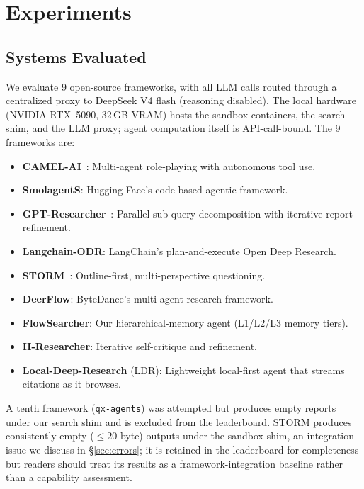 \documentclass{article}
\begin{document}
\section{Experiments}
\label{sec:experiments}

\subsection{Systems Evaluated}

We evaluate 9 open-source frameworks, with all LLM calls routed through a centralized proxy to DeepSeek V4 flash (reasoning disabled). The local hardware (NVIDIA RTX~5090, 32\,GB VRAM) hosts the sandbox containers, the search shim, and the LLM proxy; agent computation itself is API-call-bound. The 9 frameworks are:

\begin{itemize}[leftmargin=*,itemsep=1pt]
\item \textbf{CAMEL-AI}~\citep{camelai2023}: Multi-agent role-playing with autonomous tool use.
\item \textbf{SmolagentS}: Hugging Face's code-based agentic framework.
\item \textbf{GPT-Researcher}~\citep{gptresearcher2024}: Parallel sub-query decomposition with iterative report refinement.
\item \textbf{Langchain-ODR}: LangChain's plan-and-execute Open Deep Research.
\item \textbf{STORM}~\citep{storm2024}: Outline-first, multi-perspective questioning.
\item \textbf{DeerFlow}: ByteDance's multi-agent research framework.
\item \textbf{FlowSearcher}: Our hierarchical-memory agent (L1/L2/L3 memory tiers).
\item \textbf{II-Researcher}: Iterative self-critique and refinement.
\item \textbf{Local-Deep-Research} (LDR): Lightweight local-first agent that streams citations as it browses.
\end{itemize}

A tenth framework (\texttt{qx-agents}) was attempted but produces empty reports under our search shim and is excluded from the leaderboard. STORM produces consistently empty (${\le}20$ byte) outputs under the sandbox shim, an integration issue we discuss in \S\ref{sec:errors}; it is retained in the leaderboard for completeness but readers should treat its results as a framework-integration baseline rather than a capability assessment.
\end{document}
